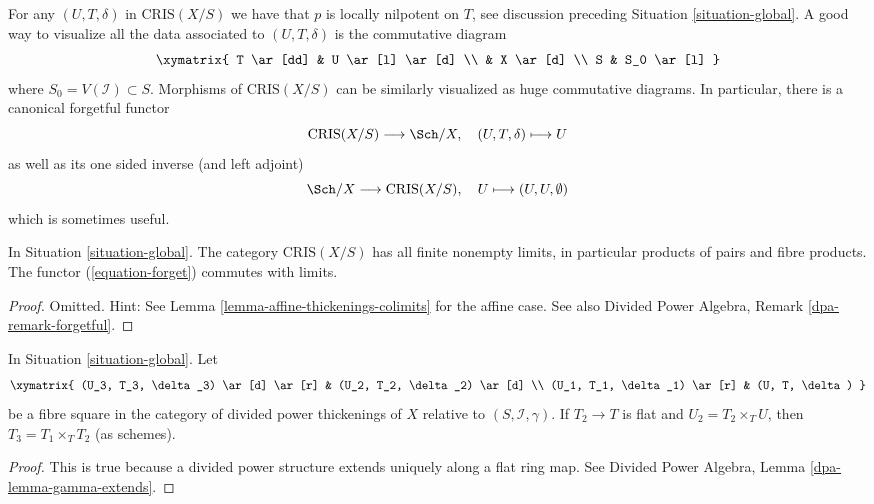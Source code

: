 \noindent
For any $(U, T, \delta)$ in $\text{CRIS}(X/S)$
we have that $p$ is locally nilpotent on $T$, see discussion preceding
Situation \ref{situation-global}.
A good way to visualize all the data associated to $(U, T, \delta)$
is the commutative diagram
$$
\xymatrix{
T \ar[dd] & U \ar[l] \ar[d] \\
& X \ar[d] \\
S & S_0 \ar[l]
}
$$
where $S_0 = V(\mathcal{I}) \subset S$. Morphisms of $\text{CRIS}(X/S)$
can be similarly visualized as huge commutative diagrams. In particular,
there is a canonical forgetful functor
\begin{equation}
\label{equation-forget}
\text{CRIS}(X/S) \longrightarrow \Sch/X,\quad
(U, T, \delta) \longmapsto U
\end{equation}
as well as its one sided inverse (and left adjoint)
\begin{equation}
\label{equation-endow-trivial}
\Sch/X \longrightarrow \text{CRIS}(X/S),\quad
U \longmapsto (U, U, \emptyset)
\end{equation}
which is sometimes useful.

\begin{lemma}
\label{lemma-divided-power-thickening-fibre-products}
In Situation \ref{situation-global}.
The category $\text{CRIS}(X/S)$ has all finite nonempty limits,
in particular products of pairs and fibre products.
The functor (\ref{equation-forget}) commutes with limits.
\end{lemma}

\begin{proof}
Omitted. Hint: See Lemma \ref{lemma-affine-thickenings-colimits}
for the affine case. See also
Divided Power Algebra, Remark \ref{dpa-remark-forgetful}.
\end{proof}

\begin{lemma}
\label{lemma-divided-power-thickening-base-change-flat}
In Situation \ref{situation-global}. Let
$$
\xymatrix{
(U_3, T_3, \delta_3) \ar[d] \ar[r] & (U_2, T_2, \delta_2) \ar[d] \\
(U_1, T_1, \delta_1) \ar[r] & (U, T, \delta)
}
$$
be a fibre square in the category of divided power thickenings of
$X$ relative to $(S, \mathcal{I}, \gamma)$. If $T_2 \to T$ is
flat and $U_2 = T_2 \times_T U$, then $T_3 = T_1 \times_T T_2$ (as schemes).
\end{lemma}

\begin{proof}
This is true because a divided power structure extends uniquely
along a flat ring map. See
Divided Power Algebra, Lemma \ref{dpa-lemma-gamma-extends}.
\end{proof}


